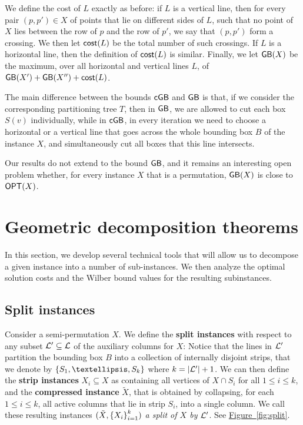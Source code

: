 \documentclass[11pt]{article}
\numberwithin{equation}{section}
\theoremstyle{definition}
\theoremstyle{plain}
\newcommand{\expref}[2]{\hyperref[#2]{#1~\ref{#2}}}
\begin{document}
We define the cost of $L$ exactly as before: if $L$ is a vertical line, then for every pair $(p,p')\in X$ of points that lie on different sides of $L$, such that no point of $X$ lies between the row of $p$ and the row of $p'$, we say that $(p,p')$ form a crossing. We then let $\mathsf{cost}(L)$ be the total number of such crossings. If $L$ is a horizontal line, then the definition of $\mathsf{cost}(L)$ is similar. Finally, we let $\mathsf{GB}(X)$ be the maximum, over all horizontal and vertical lines $L$, of $\mathsf{GB}(X')+\mathsf{GB}(X'')+\mathsf{cost}(L)$.

The main difference between the bounds $\mathsf{cGB}$ and $\mathsf{GB}$ is that, if we consider the corresponding partitioning tree $T$, then in $\mathsf{GB}$, we are allowed to cut each box $S(v)$ individually, while in $\mathsf{cGB}$, in every iteration we need to choose a horizontal or a vertical line that goes across the whole bounding box $B$ of the instance $X$, and simultaneously cut all boxes that this line intersects.

Our results do not extend to the bound $\mathsf{GB}$, and it remains an interesting open problem whether, for every instance $X$ that is a permutation, $\mathsf{GB}(X)$ is close to $\mbox{\sf OPT}(X)$.
\fi 





%


%


\section{Geometric decomposition theorems} 
\label{sec: decomp}

In this section, we develop several technical tools that will allow us to decompose a given instance into a number of sub-instances. We then analyze the optimal solution costs and the Wilber bound values for the resulting subinstances.
%
%
%


\subsection{Split instances}
\label{sec:split instance} 

Consider a semi-permutation $X$. 
We  define the \textbf{split instances} with respect to any subset ${\mathcal L}' \subseteq {\mathcal L}$ of the auxiliary columns for $X$:
Notice that the lines in ${\mathcal L}'$ partition the bounding box $B$ into a collection of internally disjoint strips, that we denote by $\set{S_1,\ldots,S_k}$ where $k = |{\mathcal L}'|+1$.
We can then define the \textbf{strip instances} $X_i \subseteq X$ as containing all vertices of $X\cap S_i$ for all $1\leq i\leq k$, and the \textbf{compressed instance} $\tilde X$, that is obtained by collapsing, for each $1\leq i\leq k$, all active columns that lie in strip $S_i$, into a single column.
We  call these resulting instances $(\tilde{X}, \left\{ X_i \right\}_{i=1}^{k})$  \emph{a split of $X$ by ${\mathcal L}'$}. 
See \expref{Figure}{fig:split}. 
\end{document}
